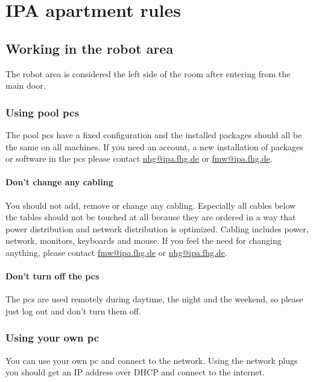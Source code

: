 \chapter{IPA apartment rules}\label{chap:apartment-rules}


\section{Working in the robot area}
The robot area is considered the left side of the room after entering from the main door.

\subsection{Using pool pcs}
The pool pcs have a fixed configuration and the installed packages should all be the same on all machines. If you need an account, a new installation of packages or software in the pcs please contact \href{mailto:nhg@ipa.fhg.de}{nhg@ipa.fhg.de} or \href{mailto:fmw@ipa.fhg.de}{fmw@ipa.fhg.de}.

\subsubsection{Don't change any cabling}\label{sec:cabling}
You should not add, remove or change any cabling. Especially all cables below the tables should not be touched at all because they are ordered in a way that power distribution and network distribution is optimized. Cabling includes power, network, monitors, keyboards and mouse. If you feel the need for changing anything, please contact \href{mailto:fmw@ipa.fhg.de}{fmw@ipa.fhg.de} or \href{mailto:nhg@ipa.fhg.de}{nhg@ipa.fhg.de}.

\subsubsection{Don't turn off the pcs}\label{sec:poolpcs}
The pcs are used remotely during daytime, the night and the weekend, so please just log out and don't turn them off.

\subsection{Using your own pc}
You can use your own pc and connect to the network. Using the network plugs you should get an IP address over DHCP and connect to the internet.

